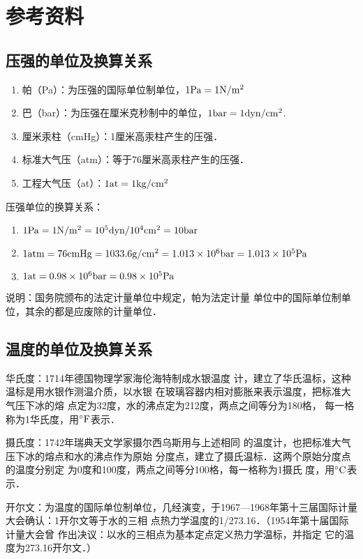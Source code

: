 \section{参考资料}
\subsection{压强的单位及换算关系}
\begin{enumerate}
    \item 帕（Pa）：为压强的国际单位制单位，$1{\rm Pa}=1{\rm N/m^2}$
    \item 巴（bar）：为压强在厘米克秒制中的单位，$1{\rm bar}=1{\rm dyn/cm^2}$.
    \item 厘米汞柱（cmHg）：1厘米高汞柱产生的压强．
    \item 标准大气压（atm）：等于76厘米高汞柱产生的压强．
    \item 工程大气压（at）：$1{\rm at}=1{\rm kg/cm^2}$
\end{enumerate}

压强单位的换算关系：
\begin{enumerate}
    \item $1{\rm Pa}=1{\rm N/m^2}=10^5{\rm dyn/10^4 cm^2}=10{\rm bar}$
    \item $1{\rm atm}=76{\rm cmHg}=1033.6{\rm g/cm^2}=1.013\times 10^6{\rm bar}=1.013\times 10^5{\rm Pa}$
    \item $1{\rm at}=0.98\times 10^6{\rm bar}=0.98\times 10^5{\rm Pa}$    
\end{enumerate}

说明：国务院颁布的法定计量单位中规定，帕为法定计量
单位中的国际单位制单位，其余的都是应废除的计量单位．

\subsection{温度的单位及换算关系}
华氏度：1714年德国物理学家海伦海特制成水银温度
计，建立了华氏温标，这种温标是用水银作测温介质，以水银
在玻璃容器内相对膨胀来表示温度，把标准大气压下冰的熔
点定为32度，水的沸点定为212度，两点之间等分为180格，
每一格称为1华氏度，用$^{\circ}{\rm F}$表示．

摄氏度：1742年瑞典天文学家摄尔西乌斯用与上述相同
的温度计，也把标准大气压下冰的熔点和水的沸点作为原始
分度点，建立了摄氏温标．这两个原始分度点的温度分别定
为0度和100度，两点之间等分100格，每一格称为1摄氏
度，用$^{\circ}{\rm C}$表示．

开尔文：为温度的国际单位制单位，几经演变，于1967—1968年第十三届国际计量大会确认：1开尔文等于水的三相
点热力学温度的1/273.16．（1954年第十届国际计量大会曾
作出决议：以水的三相点为基本定点定义热力学温标，并指定
它的温度为273.16开尔文．）

